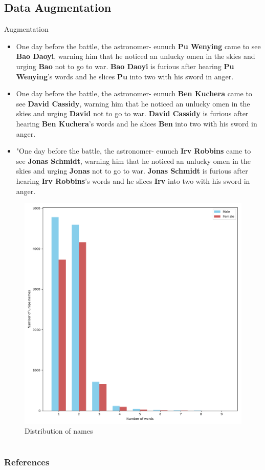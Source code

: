 \documentclass[10pt]{beamer}
\begin{document}
\subsection{Data Augmentation}
\begin{frame}{Augmentation}

  \begin{itemize}
  \item One day before the battle, the astronomer- eunuch \textbf{Pu Wenying} came to see \textbf{Bao Daoyi}, warning him that he noticed an unlucky omen in the skies and urging \textbf{Bao} not to go to war. \textbf{Bao Daoyi} is furious after hearing \textbf{Pu Wenying}'s words and he slices \textbf{Pu} into two with his sword in anger.
  
  \item One day before the battle, the astronomer- eunuch \textbf{Ben Kuchera} came to see \textbf{David Cassidy}, warning him that he noticed an unlucky omen in the skies and urging \textbf{David} not to go to war. \textbf{David Cassidy} is furious after hearing \textbf{Ben Kuchera}'s words and he slices \textbf{Ben} into two with his sword in anger.
  
  \item "One day before the battle, the astronomer- eunuch \textbf{Irv Robbins} came to see \textbf{Jonas Schmidt}, warning him that he noticed an unlucky omen in the skies and urging \textbf{Jonas} not to go to war. \textbf{Jonas Schmidt} is furious after hearing \textbf{Irv Robbins}'s words and he slices \textbf{Irv} into two with his sword in anger.
    
  \end{itemize}
\end{frame}

\begin{frame}
  \begin{figure}
    \centering
    \includegraphics[width=.7\textwidth]{augment_dist.png}
    \caption{Distribution of names}
    \label{fig:dist_names}
  \end{figure}
\end{frame}

\section{}
\begin{frame}
  \frametitle{References}
  
  
\end{frame}
\end{document}
